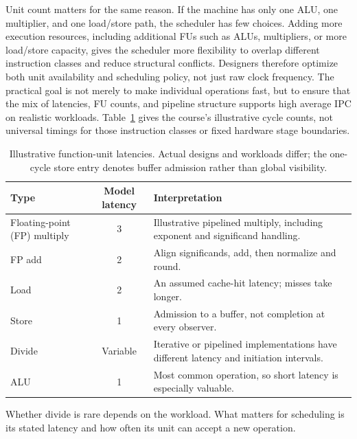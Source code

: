 Unit count matters for the same reason.
If the machine has only one ALU, one multiplier, and one load/store path, the scheduler has few choices.
Adding more execution resources, including additional FUs such as ALUs, multipliers, or more load/store capacity, gives the scheduler more flexibility to overlap different instruction classes and reduce structural conflicts.
Designers therefore optimize both unit availability and scheduling policy, not just raw clock frequency.
The practical goal is not merely to make individual operations fast, but to ensure that the mix of latencies, FU counts, and pipeline structure supports high average IPC on realistic workloads.
Table~\ref{tab:ilp-typical-latencies} gives the course's illustrative cycle counts, not universal timings for those instruction classes or fixed hardware stage boundaries.
\begin{table}[t]
    \centering
    \begin{tabular}{|l|c|p{2.7in}|}
        \hline
        Type                         & Model latency & Interpretation \\
        \hline
        Floating-point (FP) multiply & 3 & Illustrative pipelined multiply, including exponent and significand handling. \\
        \hline
        FP add                       & 2 & Align significands, add, then normalize and round. \\
        \hline
        Load                         & 2 & An assumed cache-hit latency; misses take longer. \\
        \hline
        Store                        & 1 & Admission to a buffer, not completion at every observer. \\
        \hline
        Divide                       & Variable & Iterative or pipelined implementations have different latency and initiation intervals. \\
        \hline
        ALU                          & 1               & Most common operation, so short latency is especially valuable.                                                                                  \\
        \hline
    \end{tabular}
    \caption{Illustrative function-unit latencies. Actual designs and workloads differ; the one-cycle store entry denotes buffer admission rather than global visibility.}
    \label{tab:ilp-typical-latencies}
\end{table}
Whether divide is rare depends on the workload.
What matters for scheduling is its stated latency and how often its unit can accept a new operation.


